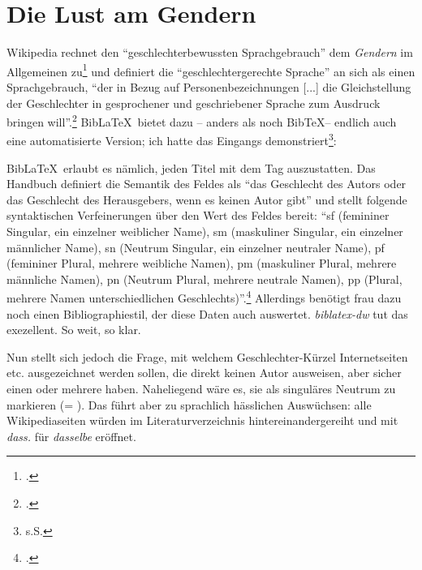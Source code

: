 
\section{Die Lust am Gendern}

Wikipedia rechnet den \enquote{geschlechterbewussten Sprachgebrauch} dem \emph{Gendern} im Allgemeinen zu\footcite[vgl.][]{Wikipedia2022a} und definiert die \enquote{geschlechtergerechte Sprache} an sich als einen Sprachgebrauch, \enquote{der in Bezug auf Personenbezeichnungen [...] die Gleichstellung der Geschlechter in gesprochener und geschriebener Sprache zum Ausdruck bringen will}.\footcite[vgl.][]{Wikipedia2022b}  Bib\LaTeX\ bietet dazu -- anders als noch Bib\TeX -- endlich auch eine automatisierte Version; ich hatte das Eingangs demonstriert\footnote{s.S. \pageref{Gender}}:

Bib\LaTeX\ erlaubt es nämlich, jeden Titel mit dem Tag  auszustatten. Das Handbuch definiert die Semantik des Feldes als \enquote{das Geschlecht des Autors oder das Geschlecht des Herausgebers, wenn es keinen Autor gibt} und stellt folgende syntaktischen Verfeinerungen über den Wert des Feldes bereit: \enquote{sf (femininer Singular, ein einzelner weiblicher Name), sm (maskuliner Singular, ein einzelner männlicher Name), sn (Neutrum Singular, ein einzelner neutraler Name), pf (femininer Plural, mehrere weibliche Namen), pm (maskuliner Plural, mehrere männliche Namen), pn (Neutrum Plural, mehrere neutrale Namen), pp (Plural, mehrere Namen unterschiedlichen Geschlechts)}.\footcite[vgl.][27]{BibLaTeX2021a} Allerdings benötigt frau dazu noch einen Bibliographiestil, der diese Daten auch auswertet. \emph{biblatex-dw} tut das exezellent. So weit, so klar.

Nun stellt sich jedoch die Frage, mit welchem Geschlechter-Kürzel Internetseiten etc. ausgezeichnet werden sollen, die direkt keinen Autor ausweisen, aber sicher einen oder mehrere haben. Naheliegend wäre es, sie als singuläres Neutrum zu markieren (= ). Das führt aber zu sprachlich hässlichen Auswüchsen: alle Wikipediaseiten würden im Literaturverzeichnis hintereinandergereiht und mit \emph{dass.} für \emph{dasselbe} eröffnet.

